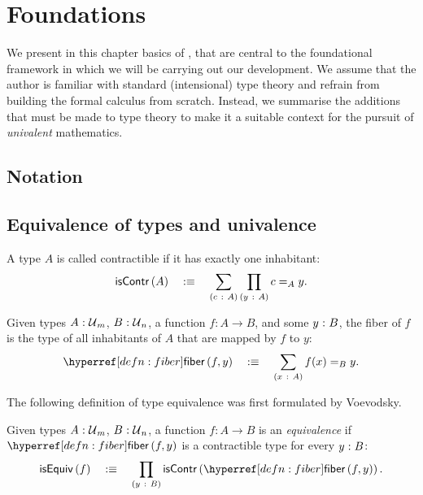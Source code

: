 \chapter{Foundations}\label{chap:foundations}

We present in this chapter basics of \UF{}, that are central to the foundational
framework in which we will be carrying out our development. We assume that the
author is familiar with standard (intensional) type theory and refrain from
building the formal calculus from scratch. Instead, we summarise the additions
that must be made to type theory to make it a suitable context for the pursuit
of \emph{univalent} mathematics.

\section{Notation}

\section{Equivalence of types and univalence}

\begin{defn}[Contractible]
  A type $A$ is called contractible if it has exactly one inhabitant:
  \begin{equation*}
    \mathsf{isContr}\left(A\right) \quad:\equiv\quad \sum_{(c~:~A)} \prod_{(y~:~A)} c =_A y.
  \end{equation*}
\end{defn}

\begin{defn}[Fiber]\label{defn:fiber}
  Given types $A\hspace{0.1mm}:\hspace{0.1mm}\mathcal{U}{}_m$, $B\hspace{0.1mm}:\hspace{0.1mm}\mathcal{U}{}_n$, a function
  $f : A \rightarrow B$, and some $y\hspace{0.1mm}:\hspace{0.1mm}B$, the fiber of $f$ is the type of all inhabitants
  of $A$ that are mapped by $f$ to $y$:
  \begin{equation*}
    \fiber{f}{y} \quad\is\quad \sigmaty{x}{A}{f(x) =_B y}.
  \end{equation*}
\end{defn}

The following definition of type equivalence was first formulated by Voevodsky.
\begin{defn}\label{defn:equiv}
  Given types $A\hspace{0.1mm}:\hspace{0.1mm}\mathcal{U}{}_m$, $B\hspace{0.1mm}:\hspace{0.1mm}\mathcal{U}{}_n$, a function $f : A \rightarrow B$ is an
  \emph{equivalence} if $\fiber{f}{y}$ is a contractible type for every $y\hspace{0.1mm}:\hspace{0.1mm}B$:
  \begin{equation*}
    \isequiv{f} \quad\is\quad \pity{y}{B}{\iscontr{\fiber{f}{y}}}.
  \end{equation*}
\end{defn}

